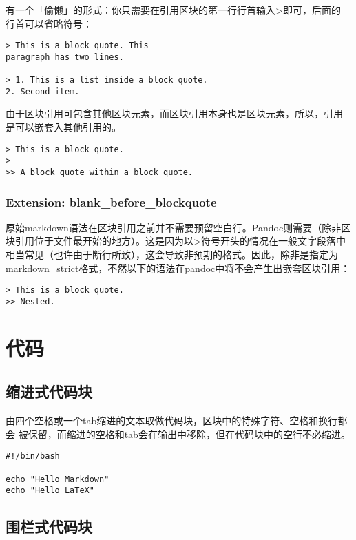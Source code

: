 \documentclass[fancyhdr,bookmark]{ctexbook}
\begin{document}
有一个「偷懒」的形式：你只需要在引用区块的第一行行首输入\textgreater{}即可，后面的
行首可以省略符号：

\begin{lstlisting}
> This is a block quote. This
paragraph has two lines.

> 1. This is a list inside a block quote.
2. Second item.
\end{lstlisting}

由于区块引用可包含其他区块元素，而区块引用本身也是区块元素，所以，引用
是可以嵌套入其他引用的。

\begin{lstlisting}
> This is a block quote.
>
>> A block quote within a block quote.
\end{lstlisting}

\subsubsection{Extension:
blank\_before\_blockquote}\label{extension-blankux5fbeforeux5fblockquote}

原始markdown语法在区块引用之前并不需要预留空白行。Pandoc则需要（除非区
块引用位于文件最开始的地方）。这是因为以\textgreater{}符号开头的情况在一般文字段落中
相当常见（也许由于断行所致），这会导致非预期的格式。因此，除非是指定为
markdown\_strict格式，不然以下的语法在pandoc中将不会产生出嵌套区块引用：

\begin{lstlisting}
> This is a block quote.
>> Nested.
\end{lstlisting}

\section{代码}\label{ux4ee3ux7801}

\subsection{缩进式代码块}\label{ux7f29ux8fdbux5f0fux4ee3ux7801ux5757}

由四个空格或一个tab缩进的文本取做代码块，区块中的特殊字符、空格和换行都会
被保留，而缩进的空格和tab会在输出中移除，但在代码块中的空行不必缩进。

\begin{lstlisting}
#!/bin/bash

echo "Hello Markdown"
echo "Hello LaTeX"
\end{lstlisting}

\subsection{围栏式代码块}\label{ux56f4ux680fux5f0fux4ee3ux7801ux5757}
\end{document}
